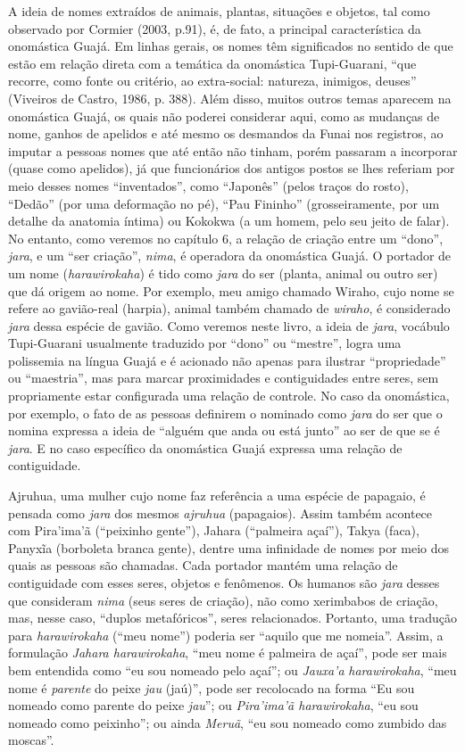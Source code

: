 A ideia de nomes extraídos de animais, plantas, situações e objetos, tal
como observado por Cormier (2003, p.91), é, de fato, a principal
característica da onomástica Guajá. Em linhas gerais, os nomes têm
significados no sentido de que estão em relação direta com a temática da
onomástica Tupi-Guarani, ``que recorre, como fonte ou critério, ao
extra-social: natureza, inimigos, deuses'' (Viveiros de Castro, 1986, p.
388). Além disso, muitos outros temas aparecem na onomástica Guajá, os
quais não poderei considerar aqui, como as mudanças de nome, ganhos de
apelidos e até mesmo os desmandos da Funai nos registros, ao imputar a
pessoas nomes que até então não tinham, porém passaram a incorporar
(quase como apelidos), já que funcionários dos antigos postos se lhes
referiam por meio desses nomes ``inventados'', como ``Japonês'' (pelos
traços do rosto), ``Dedão'' (por uma deformação no pé), ``Pau Fininho''
(grosseiramente, por um detalhe da anatomia íntima) ou Kokokwa (a um
homem, pelo seu jeito de falar). No entanto, como veremos no capítulo 6,
a relação de criação entre um ``dono'', \emph{jara}, e um ``ser
criação'', \emph{nima}, é operadora da onomástica Guajá. O portador de
um nome (\emph{harawirokaha}) é tido como \emph{jara} do ser (planta,
animal ou outro ser) que dá origem ao nome. Por exemplo, meu amigo
chamado Wiraho, cujo nome se refere ao gavião-real (harpia), animal
também chamado de \emph{wiraho}, é considerado \emph{jara} dessa espécie
de gavião. Como veremos neste livro, a ideia de \emph{jara}, vocábulo
Tupi-Guarani usualmente traduzido por ``dono'' ou ``mestre'', logra uma
polissemia na língua Guajá e é acionado não apenas para ilustrar
``propriedade'' ou ``maestria'', mas para marcar proximidades e
contiguidades entre seres, sem propriamente estar configurada uma
relação de controle. No caso da onomástica, por exemplo, o fato de as
pessoas definirem o nominado como \emph{jara} do ser que o nomina
expressa a ideia de ``alguém que anda ou está junto'' ao ser de que se é
\emph{jara}. E no caso específico da onomástica Guajá expressa uma
relação de contiguidade.

Ajruhua, uma mulher cujo nome faz referência a uma espécie de papagaio,
é pensada como \emph{jara} dos mesmos \emph{ajruhua} (papagaios). Assim
também acontece com Pira'ima'ã (``peixinho gente''), Jahara (``palmeira
açaí''), Takya (faca), Panyxĩa (borboleta branca gente), dentre uma
infinidade de nomes por meio dos quais as pessoas são chamadas. Cada
portador mantém uma relação de contiguidade com esses seres, objetos e
fenômenos. Os humanos são \emph{jara} desses que consideram \emph{nima}
(seus seres de criação), não como xerimbabos de criação, mas, nesse
caso, ``duplos metafóricos'', seres relacionados. Portanto, uma tradução
para \emph{harawirokaha} (``meu nome'') poderia ser ``aquilo que me
nomeia''. Assim, a formulação \emph{Jahara harawirokaha}, ``meu nome é
palmeira de açaí'', pode ser mais bem entendida como ``eu sou nomeado
pelo açaí''; ou \emph{Jauxa'a} \emph{harawirokaha}, ``meu nome é
\emph{parente} do peixe \emph{jau} (jaú)'', pode ser recolocado na forma
``Eu sou nomeado como parente do peixe \emph{jau}''; ou \emph{Pira'ima'ã
harawirokaha}, ``eu sou nomeado como peixinho''; ou ainda \emph{Meruã},
``eu sou nomeado como zumbido das moscas''.

